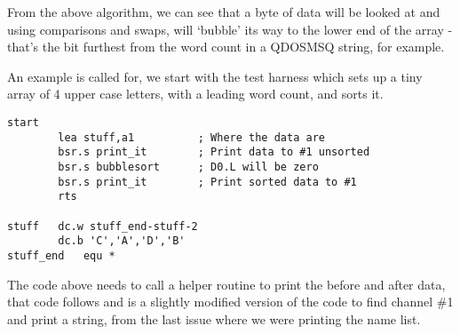 From the above algorithm, we can see that a byte of data will be looked at and using comparisons and swaps, will `bubble' its way to the lower end of the array - that's the bit furthest from the word count in a QDOSMSQ string, for example.

An example is called for, we start with the test harness which sets up a tiny array of 4 upper case letters, with a leading word count, and sorts it. 


\begin{lstlisting}[firstnumber=1,caption={Bubblesort Test Harness}]
start
        lea stuff,a1          ; Where the data are
        bsr.s print_it        ; Print data to #1 unsorted
        bsr.s bubblesort      ; D0.L will be zero
        bsr.s print_it        ; Print sorted data to #1 
        rts

stuff   dc.w stuff_end-stuff-2
        dc.b 'C','A','D','B'
stuff_end   equ *
\end{lstlisting}

The code above needs to call a helper routine to print the before and after data, that code follows and is a slightly modified version of the code to find channel \#1 and print a string, from the last issue where we were printing the name list.

